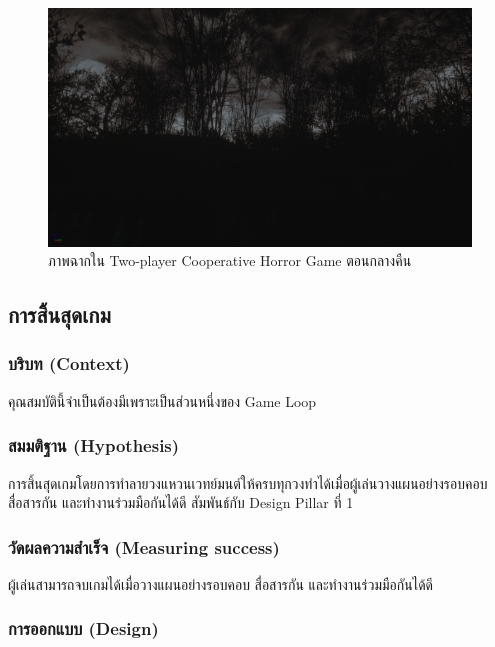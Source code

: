 \begin{figure}[h]
  \begin{center}
  \includegraphics[width=\textwidth]{./img/screenshots/nightshot1.png}
  \end{center}
  \caption[ภาพฉากใน Two-player Cooperative Horror Game ตอนเย็น]{ภาพฉากใน Two-player Cooperative Horror Game ตอนกลางคืน}
  \label{fig:nightshot1}
\end{figure}

\subsection{การสิ้นสุดเกม}

\subsubsection{บริบท (Context)}

คุณสมบัตินี้จำเป็นต้องมีเพราะเป็นส่วนหนึ่งของ Game Loop

\subsubsection{สมมติฐาน (Hypothesis)}

การสิ้นสุดเกมโดยการทำลายวงแหวนเวทย์มนต์ให้ครบทุกวงทำได้เมื่อผู้เล่นวางแผนอย่างรอบคอบ สื่อสารกัน และทำงานร่วมมือกันได้ดี สัมพันธ์กับ Design Pillar ที่ 1

\subsubsection{วัดผลความสำเร็จ (Measuring success)}
ผู้เล่นสามารถจบเกมได้เมื่อวางแผนอย่างรอบคอบ สื่อสารกัน และทำงานร่วมมือกันได้ดี

\subsubsection{การออกแบบ (Design)}

